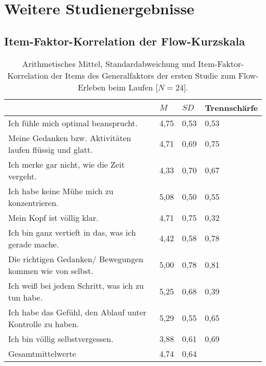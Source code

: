 

\chapter{Weitere Studienergebnisse} 

\label{cha:weitere_studienergebnisse}

\section{Item-Faktor-Korrelation der Flow-Kurzskala} 

\label{sec:item_faktor_korrelation_der_fks} 
\begin{table}
	[!htb] \centering \caption[Item-Faktor-Korrelation der Items des Generalfaktors (Erste Studie: Laufen)]{Arithmetisches Mittel, Standardabweichung und Item-Faktor-Korrelation der Items des Generalfaktors der ersten Studie zum Flow-Erleben beim Laufen [$N = 24$].} \label{tab:generalfaktor_1} 
	\begin{tabularx}
		{ 
		\textwidth}{p{} p{} p{} p{}} \toprule & $M$ & $SD$ & Trennschärfe \\
		\midrule Ich fühle mich optimal beansprucht. & 4,75 & 0,53 & 0,53 \\
		Meine Gedanken bzw. Aktivitäten laufen flüssig und glatt. & 4,71 & 0,69 & 0,75 \\
		Ich merke gar nicht, wie die Zeit vergeht. & 4,33 & 0,70 & 0,67 \\
		Ich habe keine Mühe mich zu konzentrieren. & 5,08 & 0,50 & 0,55 \\
		Mein Kopf ist völlig klar. & 4,71 & 0,75 & 0,32 \\
		Ich bin ganz vertieft in das, was ich gerade mache. & 4,42 & 0,58 & 0,78 \\
		Die richtigen Gedanken/ Bewegungen kommen wie von selbst. & 5,00 & 0,78 & 0,81 \\
		Ich weiß bei jedem Schritt, was ich zu tun habe. & 5,25 & 0,68 & 0,39 \\
		Ich habe das Gefühl, den Ablauf unter Kontrolle zu haben. & 5,29 & 0,55 & 0,65 \\
		Ich bin völlig selbstvergessen. & 3,88 & 0,61 & 0,69 \\
		Gesamtmittelwerte & 4,74 & 0,64 & \\
		\bottomrule 
	\end{tabularx}
\end{table}
